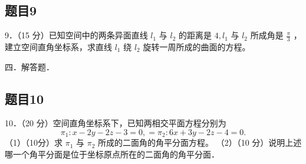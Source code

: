 \documentclass{article}
\begin{document}
\subsection{题目9}
9．（15 分）已知空间中的两条异面直线 \(l_{1}\) 与 \(l_{2}\) 的距离是 \(4, l_{1}\) 与 \(l_{2}\) 所成角是 \(\frac{\pi}{3}\) ，建立空间直角坐标系，求直线 \(l_{1}\) 绕 \(l_{2}\) 旋转一周所成的曲面的方程。

四．解答题．

\subsection{题目10}
10．（20 分）空间直角坐标系下，已知两相交平面方程分别为
\[
\pi_{1}: x-2 y-2 z-3=0,=\pi_{2}: 6 x+3 y-2 z-4=0 .
\]
（1）（10分）求 \(\pi_{1}\) 与 \(\pi_{2}\) 所成的二面角的角平分面方程。
（2）（10 分）说明上述哪一个角平分面是位于坐标原点所在的二面角的角平分面．
\end{document}
